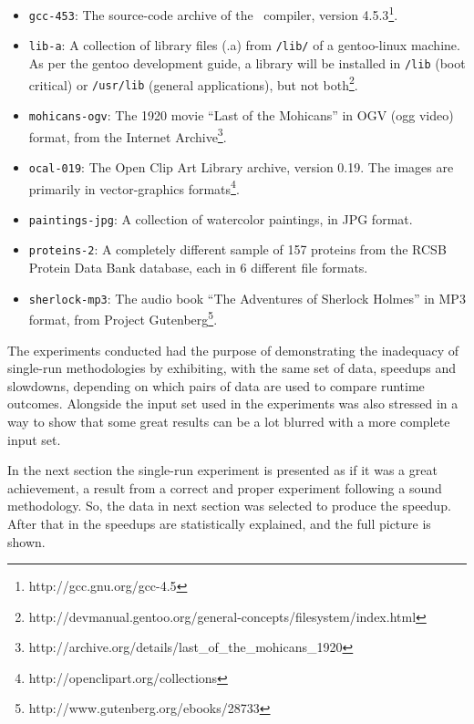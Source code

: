 {\begin{itemize}
\item {\tt gcc-453}: The source-code archive of the \gcc\ compiler, version 4.5.3\footnote{http://gcc.gnu.org/gcc-4.5}.

\item {\tt lib-a}: A collection of library files (.a) from {\tt /lib/} of a gentoo-linux machine.  As per the gentoo development guide, a library will be installed in {\tt /lib} (boot critical) or {\tt /usr/lib} (general applications), but not both\footnote{http://devmanual.gentoo.org/general-concepts/filesystem/index.html}.

\item {\tt mohicans-ogv}: The 1920 movie ``Last of the Mohicans'' in OGV (ogg video) format, from the Internet Archive\footnote{http://archive.org/details/last\_of\_the\_mohicans\_1920}.

\item {\tt ocal-019}: The Open Clip Art Library archive, version 0.19. The images are primarily in vector-graphics formats\footnote{http://openclipart.org/collections}.

\item {\tt paintings-jpg}: A collection of watercolor paintings, in JPG format.

\item {\tt proteins-2}: A completely different sample of 157 proteins from the RCSB Protein Data Bank database, each in 6 different file formats.

\item {\tt sherlock-mp3}: The audio book ``The Adventures of Sherlock Holmes'' in MP3 format, from Project Gutenberg\footnote{http://www.gutenberg.org/ebooks/28733}.

\end{itemize}
}



The experiments conducted had the purpose of demonstrating the inadequacy of single-run methodologies by exhibiting, with the same set of data, speedups and slowdowns, depending on which pairs of data are used to compare runtime outcomes. Alongside the input set used in the experiments was also stressed in a way to show that some great results can be a lot blurred with a more complete input set.

In the next section the single-run experiment is presented as if it was a great achievement, a result from a correct and proper experiment following a sound methodology. So, the data in next section was selected to produce the speedup. After that in  the speedups are statistically explained, and the full picture is shown.
